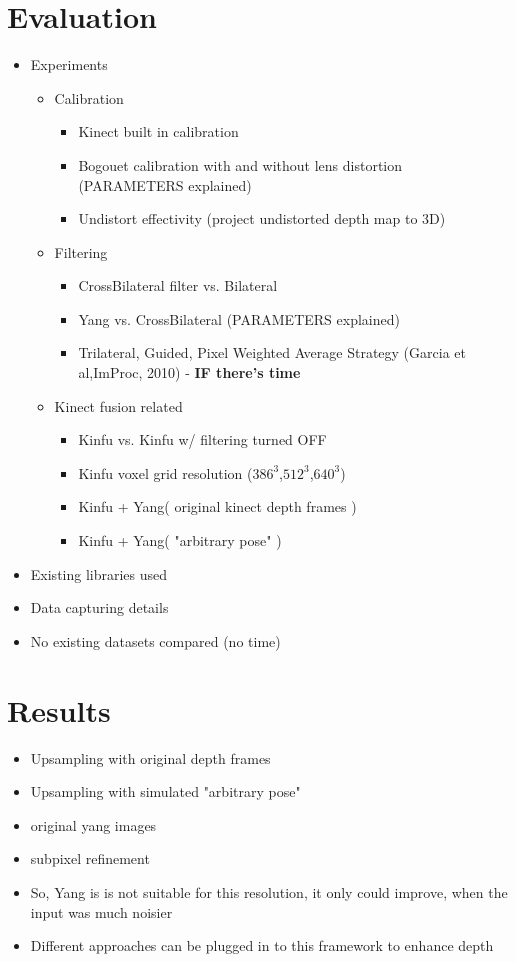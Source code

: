 \documentclass[12pt,a4paper]{article}
\begin{document}
\section{Evaluation}
	\begin{itemize}
 	\item Experiments
		\begin{itemize}
			\item Calibration
				\begin{itemize}
					\item Kinect built in calibration
					\item Bogouet calibration with and without lens distortion (PARAMETERS explained)
					\item Undistort effectivity (project undistorted depth map to 3D)
				\end{itemize}
				
			\item Filtering
				\begin{itemize}
					\item CrossBilateral filter vs. Bilateral
					\item Yang vs. CrossBilateral (PARAMETERS explained)
					\item Trilateral, Guided, Pixel Weighted Average Strategy (Garcia et al,ImProc, 2010) - {\bf IF there's time}
				\end{itemize}
			\item Kinect fusion related
			\begin{itemize}
				\item Kinfu vs. Kinfu w/ filtering turned OFF
				\item Kinfu voxel grid resolution ($386^3$,$512^3$,$640^3$)
				\item Kinfu + Yang( original kinect depth frames )
				\item Kinfu + Yang( "arbitrary pose" )
			\end{itemize}
		\end{itemize}
	\item Existing libraries used
	\item Data capturing details
	\item No existing datasets compared (no time)

	\end{itemize}

\section{Results}
\begin{itemize}
	\item Upsampling with original depth frames
	\item Upsampling with simulated "arbitrary pose"

	\item original yang images
	\item subpixel refinement
	
	\item So, Yang is is not suitable for this resolution, it only could improve, when the input was much noisier
	\item Different approaches can be plugged in to this framework to enhance depth
\end{itemize}
\end{document}
